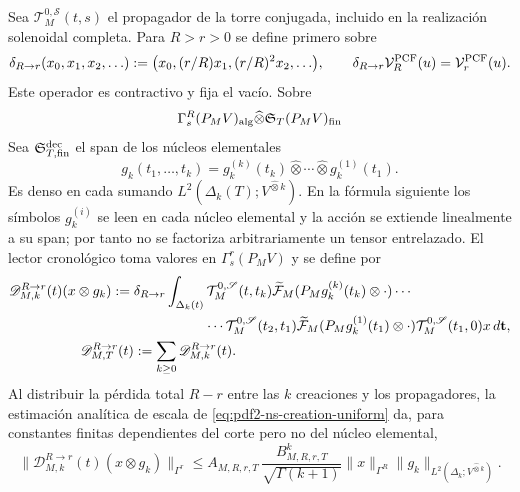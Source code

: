 Sea $\mathcal T_M^{0,\mathscr S}(t,s)$ el propagador de la torre conjugada, incluido
en la realización solenoidal completa. Para $R>r>0$ se define primero sobre
\begin{equation}\label{eq:pdf2-ns-radial-transfer}
 \delta_{R\to r}(x_0,x_1,x_2,\ldots)
 :=\bigl(x_0,(r/R)x_1,(r/R)^2x_2,\ldots\bigr),
 \qquad
 \delta_{R\to r}\mathcal V_R^{\rm PCF}(u)=\mathcal V_r^{\rm PCF}(u).
\end{equation}
Este operador es contractivo y fija el vacío. Sobre
\begin{equation}\label{eq:pdf2-ns-dyson-domain}
 \Gamma_s^R(P_MV)_{\rm alg}\widehat\otimes
 \mathfrak S_T(P_MV)_{\rm fin}
\end{equation}
Sea $\mathfrak S_{T,{\rm fin}}^{\rm dec}$ el span de los núcleos elementales
\[
 g_k(t_1,\ldots,t_k)=
 g_k^{(k)}(t_k)\widehat\otimes\cdots\widehat\otimes g_k^{(1)}(t_1).
\]
Es denso en cada sumando $L^2(\Delta_k(T);V^{\widehat\otimes k})$. En la
fórmula siguiente los símbolos $g_k^{(i)}$ se leen en cada núcleo elemental y
la acción se extiende linealmente a su span; por tanto no se factoriza
arbitrariamente un tensor entrelazado. El lector cronológico toma valores en
$\Gamma_s^r(P_MV)$ y se define por
\begin{equation}\label{eq:pdf2-ns-dyson-reader}
 \begin{aligned}
 \mathscr D_{M,k}^{R\to r}(t)(x\otimes g_k)
 :={}&\delta_{R\to r}\int_{\Delta_k(t)}
 \mathcal T_M^{0,\mathscr S}(t,t_k)
 \widetilde{\mathcal F}_M(P_Mg_k^{(k)}(t_k)\otimes\cdot)\cdots\\
 &\hspace{18mm}\cdots\mathcal T_M^{0,\mathscr S}(t_2,t_1)
 \widetilde{\mathcal F}_M(P_Mg_k^{(1)}(t_1)\otimes\cdot)
 \mathcal T_M^{0,\mathscr S}(t_1,0)x\,d\mathbf t,\\
 \mathscr D_{M,T}^{R\to r}(t)&:=\sum_{k\geq0}
 \mathscr D_{M,k}^{R\to r}(t).
 \end{aligned}
\end{equation}
Al distribuir la pérdida total $R-r$ entre las $k$ creaciones y los propagadores,
la estimación analítica de escala de
\eqref{eq:pdf2-ns-creation-uniform} da, para constantes finitas dependientes del
corte pero no del núcleo elemental,
\begin{equation}\label{eq:pdf2-ns-dyson-homogeneous-bound}
 \|\mathscr D_{M,k}^{R\to r}(t)(x\otimes g_k)\|_{\Gamma^r}
 \le A_{M,R,r,T}\,
 \frac{B_{M,R,r,T}^{k}}{\sqrt{\Gamma(k+1)}}
 \|x\|_{\Gamma^R}\|g_k\|_{L^2(\Delta_k;V^{\widehat\otimes k})}.
\end{equation}
